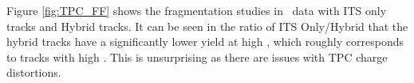 Figure \ref{fig:TPC_FF} shows the fragmentation studies in \pPb~data with ITS only tracks and Hybrid tracks. It can be seen in the ratio of ITS Only/Hybrid that the hybrid tracks have a significantly lower yield at high \zt, which roughly corresponds to tracks with high \pt. This is unsurprising as there are issues with TPC charge distortions.



